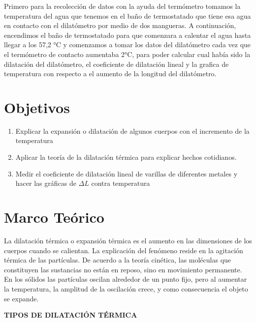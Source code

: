 \documentclass[journal,transmag]{IEEEtran}
\begin{document}
\begin{enumerate}
	\end{enumerate}

Primero para la recolección de datos con la ayuda del termómetro tomamos la temperatura del agua que tenemos en el baño de termostatado que tiene esa agua en contacto con el dilatómetro por medio de dos mangueras. A continuación, encendimos el baño de termostatado para que comenzara a calentar el agua hasta llegar a los 57,2 °C y comenzamos a tomar los datos del dilatómetro cada vez que el termómetro de contacto aumentaba 2°C, para poder calcular cual había sido la dilatación del dilatómetro, el coeficiente de dilatación lineal y la grafica de temperatura con respecto a el aumento de la longitud del dilatómetro.

\section{Objetivos}

\begin{enumerate}
	
    \item Explicar la expansión o dilatación de algunos cuerpos con el incremento de la temperatura
    
    \item Aplicar la teoría de la dilatación térmica para explicar hechos cotidianos.
    \item Medir el coeficiente de dilatación lineal de varillas de diferentes metales y hacer las gráficas de $\Delta L$ contra temperatura

	\end{enumerate}
\section{Marco Teórico}

 La dilatación térmica o expansión térmica es el aumento en las dimensiones de los cuerpos cuando se calientan.
La explicación del fenómeno reside en la agitación térmica de las partículas. De acuerdo a la teoría cinética, las moléculas que constituyen las sustancias no están en reposo, sino en movimiento permanente.
En los sólidos las partículas oscilan alrededor de un punto fijo, pero al aumentar la temperatura, la amplitud de la oscilación crece, y como consecuencia el objeto se expande.
 
 
 
\textbf{     TIPOS DE DILATACIÓN TÉRMICA}
 
\end{document}
